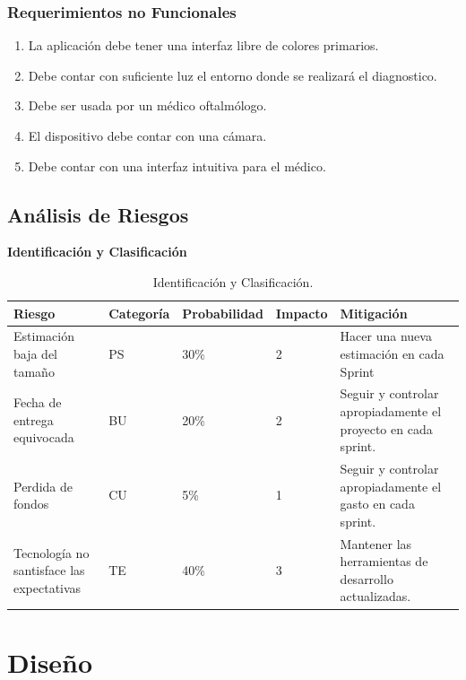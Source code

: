 \documentclass[10pt]{article}
\begin{document}
\subsubsection{Requerimientos no Funcionales}

\begin{enumerate}
    \item La aplicación debe tener una interfaz libre de colores primarios.
    \item Debe contar con suficiente luz el entorno donde se realizará el diagnostico.
    \item Debe ser usada por un médico oftalmólogo.
    \item El dispositivo debe contar con una cámara.
    \item Debe contar con una interfaz intuitiva para el médico.
    
\end{enumerate}
\newpage
\subsection{Análisis de Riesgos}

\textbf{Identificación y Clasificación}

\begin{table}[htbp]
\begin{center}
\begin{tabular}{|p{2.2cm}|p{2.2cm}|p{2.2cm}|p{2.2cm}|p{2.2cm}|}
\hline
Riesgo & Categoría & Probabilidad & Impacto & Mitigación \\
\hline
Estimación baja del tamaño & PS & 30\% & 2 & Hacer una nueva estimación en cada Sprint \\
\hline
Fecha de entrega equivocada & BU & 20\% & 2 & Seguir y controlar apropiadamente el proyecto en cada sprint. \\
\hline
Perdida de fondos & CU & 5\% & 1 & Seguir y controlar apropiadamente el gasto en cada sprint. \\
\hline
Tecnología no santisface las expectativas & TE & 40\% & 3 & Mantener las herramientas de desarrollo actualizadas. \\
\hline
\end{tabular}
\caption{Identificación y Clasificación.}
\label{tabla2}
\end{center}
\end{table}

\newpage
\section{Diseño}
\end{document}
